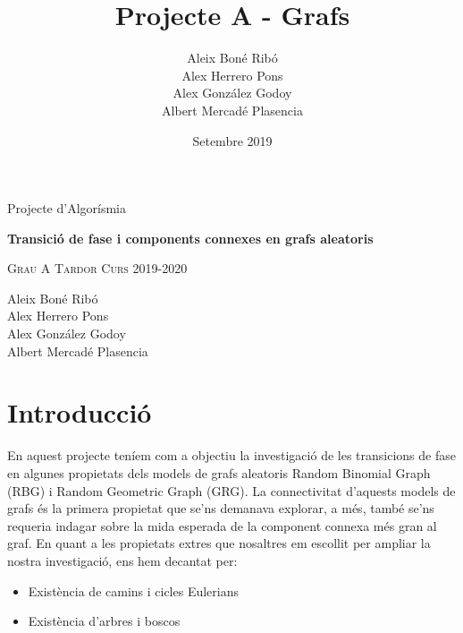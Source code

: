 



%

\title{Projecte A - Grafs}
\author{
Aleix Boné Ribó\\
Alex Herrero Pons\\
Alex González Godoy\\
Albert Mercadé Plasencia\\
}
\date{Setembre 2019}



\thispagestyle{empty}
\clearpage
\setcounter{page}{-1}

\begin{titlepage}
{
    \centering
    \null
    \vfill
    {\Large Projecte d'Algorísmia\par}
    \vspace{2em}
    {\Huge \bfseries 
    Transició de fase i components connexes en grafs aleatoris
    \par}
    \vspace{2em}
    {\large \scshape 
    Grau A \qquad Tardor Curs 2019-2020
    \par}
    \vfill
\begin{center}
    
\end{center}
    \vspace{3cm}

    \vfill
    {\raggedleft \large
Aleix Boné Ribó\\
Alex Herrero Pons\\
Alex González Godoy\\
Albert Mercadé Plasencia\\
        \par}
}
\end{titlepage}

\pagebreak
{} 

\tableofcontents
\pagebreak
{} 

\section{Introducció}
En aquest projecte teníem com a objectiu la investigació de les transicions de fase en algunes propietats dels models de grafs aleatoris Random Binomial Graph (RBG) i Random Geometric Graph (GRG). La connectivitat d'aquests models de grafs és la primera propietat que se'ns demanava explorar, a més, també se'ns requeria indagar sobre la mida esperada de la component connexa més gran al graf. En quant a les propietats extres que nosaltres em escollit per ampliar la nostra investigació, ens hem decantat per:
\begin{itemize}
    \item Existència de camins i cicles Eulerians
    \item Existència d'arbres i boscos
\end{itemize}

